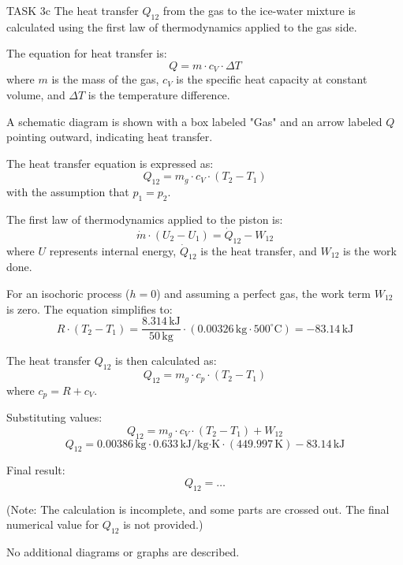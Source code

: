 TASK 3c  
The heat transfer \( Q_{12} \) from the gas to the ice-water mixture is calculated using the first law of thermodynamics applied to the gas side.  

The equation for heat transfer is:  
\[
Q = m \cdot c_V \cdot \Delta T
\]  
where \( m \) is the mass of the gas, \( c_V \) is the specific heat capacity at constant volume, and \( \Delta T \) is the temperature difference.  

A schematic diagram is shown with a box labeled "Gas" and an arrow labeled \( Q \) pointing outward, indicating heat transfer.  

The heat transfer equation is expressed as:  
\[
Q_{12} = m_g \cdot c_V \cdot (T_2 - T_1)
\]  
with the assumption that \( p_1 = p_2 \).  

The first law of thermodynamics applied to the piston is:  
\[
\dot{m} \cdot (U_2 - U_1) = \dot{Q}_{12} - W_{12}
\]  
where \( U \) represents internal energy, \( \dot{Q}_{12} \) is the heat transfer, and \( W_{12} \) is the work done.  

For an isochoric process (\( h = 0 \)) and assuming a perfect gas, the work term \( W_{12} \) is zero. The equation simplifies to:  
\[
R \cdot (T_2 - T_1) = \frac{8.314 \, \text{kJ}}{50 \, \text{kg}} \cdot (0.00326 \, \text{kg} \cdot 500^\circ\text{C}) = -83.14 \, \text{kJ}
\]  

The heat transfer \( Q_{12} \) is then calculated as:  
\[
Q_{12} = m_g \cdot c_p \cdot (T_2 - T_1)
\]  
where \( c_p = R + c_V \).  

Substituting values:  
\[
Q_{12} = m_g \cdot c_V \cdot (T_2 - T_1) + W_{12}
\]  
\[
Q_{12} = 0.00386 \, \text{kg} \cdot 0.633 \, \text{kJ/kg·K} \cdot (449.997 \, \text{K}) - 83.14 \, \text{kJ}
\]  

Final result:  
\[
Q_{12} = \ldots
\]  

(Note: The calculation is incomplete, and some parts are crossed out. The final numerical value for \( Q_{12} \) is not provided.)  

No additional diagrams or graphs are described.